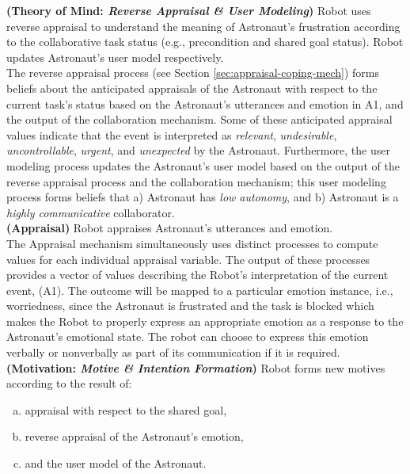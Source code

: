 \noindent \textbf{(Theory of Mind: \textit{Reverse Appraisal \& User
Modeling})} Robot uses reverse appraisal to understand the meaning of
Astronaut's frustration according to the collaborative task status (e.g.,
precondition and shared goal status). Robot updates Astronaut's user model
respectively.\\

The reverse appraisal process (see Section \ref{sec:appraisal-coping-mech})
forms beliefs about the anticipated appraisals of the Astronaut with respect to
the current task's status based on the Astronaut's utterances and emotion in A1,
and the output of the collaboration mechanism. Some of these anticipated
appraisal values indicate that the event is interpreted as \textit{relevant},
\textit{undesirable}, \textit{uncontrollable}, \textit{urgent}, and
\textit{unexpected} by the Astronaut. Furthermore, the user modeling process
updates the Astronaut's user model based on the output of the reverse appraisal
process and the collaboration mechanism; this user modeling process forms
beliefs that a) Astronaut has \textit{low autonomy}, and b) Astronaut is a
\textit{highly communicative} collaborator.\\

\noindent \textbf{(Appraisal)} Robot appraises Astronaut's utterances and
emotion.\\

The Appraisal mechanism simultaneously uses distinct processes to compute values
for each individual appraisal variable. The output of these processes provides a
vector of values describing the Robot's interpretation of the current event,
(A1). The outcome will be mapped to a particular emotion instance, i.e.,
worriedness, since the Astronaut is frustrated and the task is blocked which
makes the Robot to properly express an appropriate emotion as a response to the
Astronaut's emotional state. The robot can choose to express this emotion
verbally or nonverbally as part of its communication if it is required.\\

\noindent \textbf{(Motivation: \textit{Motive \& Intention Formation})}
Robot forms new motives according to the result of:

\begin{enumerate}[a)]
  \item appraisal with respect to the shared goal,
  \item reverse appraisal of the Astronaut's emotion,
  \item and the user model of the Astronaut. 
\end{enumerate}

